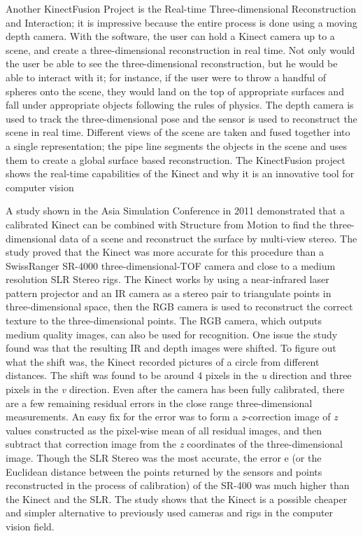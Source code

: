 \documentclass[pdftex,10.5pt]{report}
\begin{document}
Another KinectFusion Project is the Real-time Three-dimensional Reconstruction and Interaction; it is impressive because the entire process is done using a moving depth camera. With the software, the user can hold a Kinect camera up to a scene, and create a three-dimensional reconstruction in real time. Not only would the user be able to see the three-dimensional reconstruction, but he would be able to interact with it; for instance, if the user were to throw a handful of spheres onto the scene, they would land on the top of appropriate surfaces and fall under appropriate objects following the rules of physics. The depth camera is used to track the three-dimensional pose and the sensor is used to reconstruct the scene in real time. Different views of the scene are taken and fused together into a single representation; the pipe line segments the objects in the scene and uses them to create a global surface based reconstruction. The KinectFusion project shows the real-time capabilities of the Kinect and why it is an innovative tool for computer vision

A study shown in the Asia Simulation Conference in 2011 demonstrated that a calibrated Kinect can be combined with Structure from Motion to find the three-dimensional data of a scene and reconstruct the surface by multi-view stereo. The study proved that the Kinect was more accurate for this procedure than a SwissRanger SR-4000 three-dimensional-TOF camera and close to a medium resolution SLR Stereo rigs. The Kinect works by using a near-infrared laser pattern projector and an IR camera as a stereo pair to triangulate points in three-dimensional space, then the RGB camera is used to reconstruct the correct texture to the three-dimensional points. The RGB camera, which outputs medium quality images, can also be used for recognition. One issue the study found was that the resulting IR and depth images were shifted. To figure out what the shift was, the Kinect recorded pictures of a circle from different distances. The shift was found to be around 4 pixels in the \emph{u} direction and three pixels in the \emph{v} direction. Even after the camera has been fully calibrated, there are a few remaining residual errors in the close range three-dimensional measurements. An easy fix for the error was to form a \emph{z}-correction image of \emph{z} values constructed as the pixel-wise mean of all residual images, and then subtract that correction image from the \emph{z} coordinates of the three-dimensional image.\cite{cite1} Though the SLR Stereo was the most accurate, the error e (or the Euclidean distance between the points returned by the sensors and points reconstructed in the process of calibration) of the SR-400 was much higher than the Kinect and the SLR. The study shows that the Kinect is a possible cheaper and simpler alternative to previously used cameras and rigs in the computer vision field.
\end{document}
